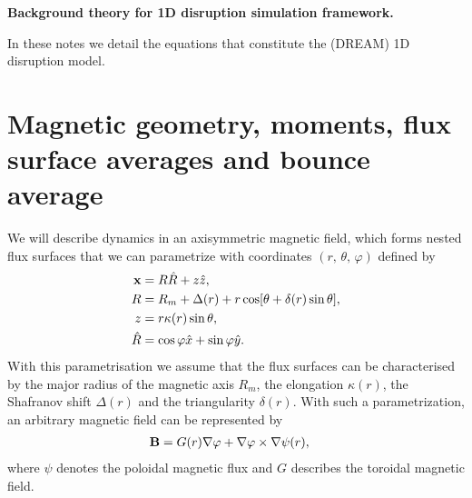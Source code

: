\documentclass[11pt,a4paper]{article}
\renewcommand{\b}[1]{\ensuremath{ {\bf #1 } }}
\begin{document}
\begin{center}
\Large \bf Background theory for 1D disruption simulation framework.
\end{center}

\vspace{10mm}

In these notes we detail the equations that constitute the (DREAM) 1D disruption model. 


\tableofcontents



\section{Magnetic geometry, moments, flux surface averages and bounce average}
We will describe dynamics in an axisymmetric magnetic field, which forms nested flux surfaces that we can parametrize with coordinates $(r,\,\theta,\,\varphi)$ defined by
\begin{align}
\b{x} &= R\hat{R} + z\hat{z}, \nonumber \\
R &= R_m + \Delta(r) + r\cos[\theta +\delta(r) \sin\theta], \nonumber \\
z &= r \kappa(r) \sin\theta, \nonumber \\
\hat{R} &= \cos\varphi \hat{x} + \sin\varphi \hat{y}.
\label{eq:geometry coordinates}
\end{align}
With this parametrisation we assume that the flux surfaces can be characterised by the major radius of the magnetic axis $R_m$, the elongation $\kappa(r)$, the Shafranov shift $\Delta(r)$ and the triangularity $\delta(r)$.
With such a parametrization, an arbitrary magnetic field can be represented by
\begin{align}
\b{B} &= G(r) \nabla \varphi + \nabla \varphi \times \nabla \psi(r),
\end{align}
where $\psi$ denotes the poloidal magnetic flux and $G$ describes the toroidal magnetic field.
\end{document}
